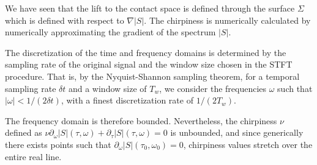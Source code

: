 \documentclass[
  american,
]{article}
\begin{document}
We have seen that the lift to the contact space is defined through
the surface \(\Sigma\) which is defined with respect to \(\nabla\left\lvert S\right\rvert\).
The chirpiness is numerically calculated by numerically approximating
the gradient of the spectrum \(\left\lvert S\right\rvert\).

The discretization of the time and frequency domains is determined by
the sampling rate of the original signal and the window size
chosen in the STFT procedure.
That is, by the Nyquist-Shannon sampling theorem,
for a temporal sampling rate \(\delta t\) and a window size of \(T_w\),
we consider the frequencies \(\omega\) such that \(|\omega|<1/(2\delta t)\),
with a finest discretization rate of \(1/(2T_w)\).

The frequency domain is therefore bounded.
Nevertheless, the chirpiness \(\nu\) defined as
\(\nu\partial_\omega\left\lvert S\right\rvert(\tau,\omega) + \partial_\tau\left\lvert S\right\rvert(\tau,\omega)=0\) is unbounded,
and since generically there exists points such that
\(\partial_\omega\left\lvert S\right\rvert(\tau_0,\omega_0)=0\),
chirpiness values stretch over the entire real line.
\end{document}
